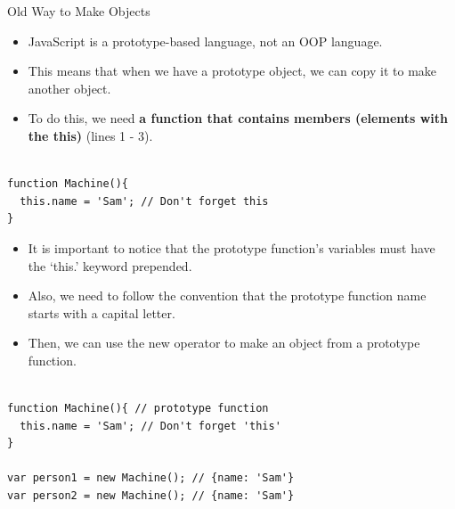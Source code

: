 \begin{frame}[fragile]{Old Way to Make Objects}

\begin{itemize}
	\item JavaScript is a prototype-based language, not an OOP language.
	\item This means that when we have a prototype object, we can copy it to make another object. 
	\item To do this, we need \textbf{a function that contains members (elements with the this)} (lines 1 - 3). 
\end{itemize}

\begin{Code}{}%
\begin{lstlisting}[firstnumber=1, label=glabels, xleftmargin=0pt, basicstyle=\scriptsize]% 

function Machine(){
  this.name = 'Sam'; // Don't forget this
}
\end{lstlisting}%
\end{Code}%
\end{frame}

\begin{frame}[fragile]{}

\begin{itemize}
	\item It is important to notice that the prototype function's variables must have the `this.' keyword prepended. 
	\item Also, we need to follow the convention that the prototype function name starts with a capital letter. 
	\item Then, we can use the new operator to make an object from a prototype function.
\end{itemize}

\begin{Code}{}%
\begin{lstlisting}[firstnumber=1, label=glabels, xleftmargin=0pt, basicstyle=\scriptsize]% 

function Machine(){ // prototype function
  this.name = 'Sam'; // Don't forget 'this'
}

var person1 = new Machine(); // {name: 'Sam'}
var person2 = new Machine(); // {name: 'Sam'}
\end{lstlisting}%
\end{Code}%

\end{frame}

